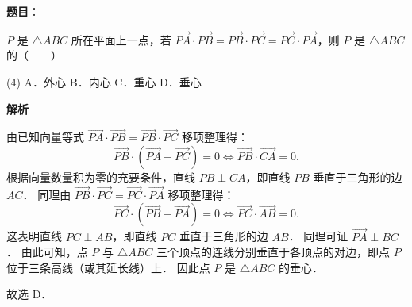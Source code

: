 \begin{answer}

\textbf{题目}：

$P$ 是 $\triangle ABC$ 所在平面上一点，若 $\vec{PA} \cdot \vec{PB} = \vec{PB} \cdot \vec{PC} = \vec{PC} \cdot \vec{PA}$，则 $P$ 是 $\triangle ABC$ 的\mbox{（　　）}

\begin{gkopts}(4)
\task A．外心
\task B．内心
\task C．重心
\task D．垂心
\end{gkopts}

\textbf{解析}

由已知向量等式 $\vec{PA} \cdot \vec{PB} = \vec{PB} \cdot \vec{PC}$ 移项整理得：
\nopagebreak[4]
\[
\vec{PB} \cdot (\vec{PA} - \vec{PC}) = 0 \iff \vec{PB} \cdot \vec{CA} = 0.
\]
根据向量数量积为零的充要条件，直线 $PB \perp CA$，即直线 $PB$ 垂直于三角形的边 $AC$．
同理由 $\vec{PB} \cdot \vec{PC} = \vec{PC} \cdot \vec{PA}$ 移项整理得：
\nopagebreak[4]
\[
\vec{PC} \cdot (\vec{PB} - \vec{PA}) = 0 \iff \vec{PC} \cdot \vec{AB} = 0.
\]
这表明直线 $PC \perp AB$，即直线 $PC$ 垂直于三角形的边 $AB$．
同理可证 $\vec{PA} \perp BC$．
由此可知，点 $P$ 与 $\triangle ABC$ 三个顶点的连线分别垂直于各顶点的对边，即点 $P$ 位于三条高线（或其延长线）上．
因此点 $P$ 是 $\triangle ABC$ 的垂心．

故选 D．


\end{answer}
